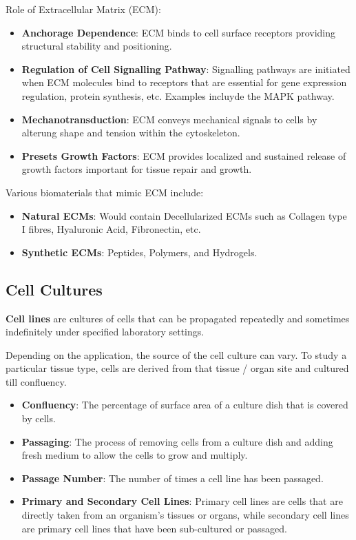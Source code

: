 \documentclass[12pt]{article}
\begin{document}
\noindent
Role of Extracellular Matrix (ECM):
\begin{itemize}
    \item \textbf{Anchorage Dependence}: ECM binds to cell surface receptors providing structural stability and positioning.
    \item \textbf{Regulation of Cell Signalling Pathway}: Signalling pathways are initiated when ECM molecules bind to receptors that are essential for gene expression regulation, protein synthesis, etc. Examples incluyde the MAPK pathway.
    \item \textbf{Mechanotransduction}: ECM conveys mechanical signals to cells by alterung shape and tension within the cytoskeleton.
    \item \textbf{Presets Growth Factors}: ECM provides localized and sustained release of growth factors important for tissue repair and growth.
\end{itemize}

\noindent
Various biomaterials that mimic ECM include:
\begin{itemize}
    \item \textbf{Natural ECMs}: Would contain Decellularized ECMs such as Collagen type I fibres,
          Hyaluronic Acid, Fibronectin, etc.
    \item \textbf{Synthetic ECMs}: Peptides, Polymers, and Hydrogels.
\end{itemize}

\subsection{Cell Cultures}
\textbf{Cell lines} are cultures of cells that can be propagated repeatedly and sometimes indefinitely under specified laboratory settings.

Depending on the application, the source of the cell culture can vary. To study
a particular tissue type, cells are derived from that tissue / organ site and
cultured till confluency.
\begin{itemize}
    \item \textbf{Confluency}: The percentage of surface area of a culture dish that is covered by cells.
    \item \textbf{Passaging}: The process of removing cells from a culture dish and adding fresh medium to allow the cells to grow and multiply.
    \item \textbf{Passage Number}: The number of times a cell line has been passaged.
    \item \textbf{Primary and Secondary Cell Lines}: Primary cell lines are cells that are directly taken from an organism's tissues or organs, while secondary cell lines are primary cell lines that have been sub-cultured or passaged.
\end{itemize}
\end{document}
